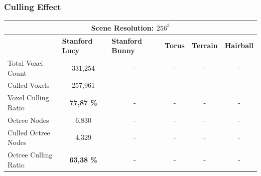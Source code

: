 \subsubsection*{Culling Effect}

\begin{table}[h]
    \begin{tabular}{|lccccc|}
    \hline
    \multicolumn{6}{|c|}{\textbf{Scene Resolution: $256^3$}}                                                                                                                                                                                                         \\ \hline
    \multicolumn{1}{|l|}{}                          & \multicolumn{1}{|l|}{\textbf{Stanford Lucy}}  & \multicolumn{1}{l|}{\textbf{Stanford Bunny}}  & \multicolumn{1}{l|}{\textbf{Torus}}   & \multicolumn{1}{l|}{\textbf{Terrain}}     & \multicolumn{1}{l|}{\textbf{Hairball}}    \\ \hline
    \multicolumn{1}{|l|}{Total Voxel Count}         & \multicolumn{1}{c|}{331,254}                  & \multicolumn{1}{c|}{-}                        & \multicolumn{1}{c|}{-}                & \multicolumn{1}{c|}{-}                    & \multicolumn{1}{c|}{-}                    \\
    \multicolumn{1}{|l|}{Culled Voxels}             & \multicolumn{1}{c|}{257,961}                  & \multicolumn{1}{c|}{-}                        & \multicolumn{1}{c|}{-}                & \multicolumn{1}{c|}{-}                    & -                                         \\
    \multicolumn{1}{|l|}{Voxel Culling Ratio}       & \multicolumn{1}{c|}{\textbf{77,87 \%}}        & \multicolumn{1}{c|}{-}                        & \multicolumn{1}{c|}{-}                & \multicolumn{1}{c|}{-}                    & -                                         \\ \hline
    \multicolumn{1}{|l|}{Octree Nodes}              & \multicolumn{1}{c|}{6,830}                    & \multicolumn{1}{c|}{-}                        & \multicolumn{1}{c|}{-}                & \multicolumn{1}{c|}{-}                    & -                                         \\
    \multicolumn{1}{|l|}{Culled Octree Nodes}       & \multicolumn{1}{c|}{4,329}                    & \multicolumn{1}{c|}{-}                        & \multicolumn{1}{c|}{-}                & \multicolumn{1}{c|}{-}                    & -                                         \\
    \multicolumn{1}{|l|}{Octree Culling Ratio}      & \multicolumn{1}{c|}{\textbf{63,38 \%}}        & \multicolumn{1}{c|}{-}                        & \multicolumn{1}{c|}{-}                & \multicolumn{1}{c|}{-}                    & -                                         \\ \hline
    \end{tabular}
\end{table}


